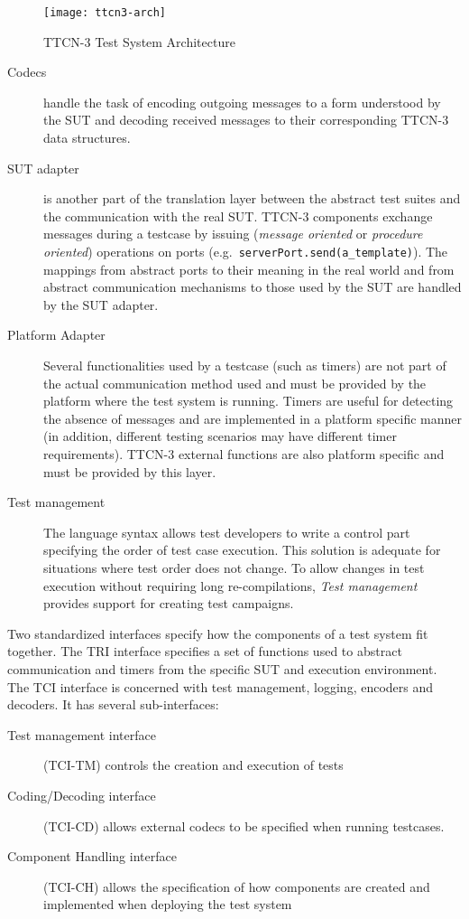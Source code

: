\begin{figure}
\centering
\texttt{[image: ttcn3-arch]}
\caption{TTCN-3 Test System Architecture\label{fig:ttcn3-arch}}
\end{figure}

\begin{description}
\item[Codecs]
	handle the task of
	encoding outgoing messages to a form understood by the \ac{SUT}
	and decoding received messages
	to their corresponding \ac{TTCN-3} data structures.
\item[\ac{SUT} adapter]
	is another part of the translation layer
	between the abstract test suites
	and the communication with the real \ac{SUT}.
	\ac{TTCN-3} components exchange messages during a testcase by issuing
	(\emph{message oriented} or \emph{procedure oriented})
	operations on ports (e.g.\ \verb=serverPort.send(a_template)=).
	The mappings from abstract ports to their meaning in the real world
	and from abstract communication mechanisms
	to those used by the \ac{SUT}
	are handled by the \ac{SUT} adapter.
\item[Platform Adapter]
	Several functionalities used by a testcase (such as timers)
	are not part of the actual communication method used
	and must be provided by the platform where the test system is running.
	Timers are useful for detecting the absence of messages
	and are implemented in a platform specific manner
	(in addition,
	different testing scenarios may have different timer requirements).
	\ac{TTCN-3} external functions are also platform specific
	and must be provided by this layer.
\item[Test management]
	The language syntax allows test developers to write a control part
	specifying the order of test case execution.
	This solution is adequate for situations
	where test order does not change.
	To allow changes in test execution
	without requiring long re-compilations,
	\emph{Test management} provides support for creating test campaigns.
\end{description}

Two standardized interfaces
specify how the components of a test system fit together.
The \ac{TRI} interface specifies a set of functions
used to abstract communication and timers
from the specific \ac{SUT} and execution environment.
The \ac{TCI} interface is concerned with
test management, logging, encoders and decoders.
It has several sub-interfaces:
\begin{description}
\item[Test management interface]
	(TCI-TM) controls the creation and execution of tests
\item[Coding/Decoding interface]
	(TCI-CD) allows external codecs to be specified when running testcases.
\item[Component Handling interface]
	(TCI-CH) allows the specification of how
	components are created and implemented when deploying the test system
\end{description}
